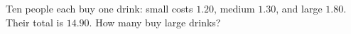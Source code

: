 Ten people each buy one drink: small costs $1.20$, medium $1.30$, and large $1.80$. Their total is $14.90$. How many buy large drinks?
